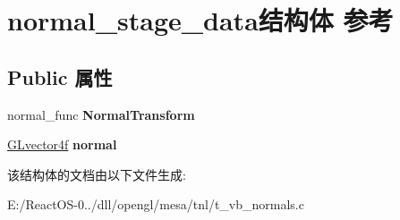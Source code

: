 \hypertarget{structnormal__stage__data}{}\section{normal\+\_\+stage\+\_\+data结构体 参考}
\label{structnormal__stage__data}
\subsection*{Public 属性}
\begin{DoxyCompactItemize}
\item 
\mbox{\label{structnormal__stage__data_aba0f0ae293a0d2611aeb3caa4be70d5d}} 
normal\+\_\+func {\bfseries Normal\+Transform}
\item 
\mbox{\label{structnormal__stage__data_a978a6dc31b7da4456c6c9694dfe7ddfb}} 
\hyperlink{struct_g_lvector4f}{G\+Lvector4f} {\bfseries normal}
\end{DoxyCompactItemize}


该结构体的文档由以下文件生成\+:\begin{DoxyCompactItemize}
\item 
E\+:/\+React\+O\+S-\/0../dll/opengl/mesa/tnl/t\+\_\+vb\+\_\+normals.\+c\end{DoxyCompactItemize}
